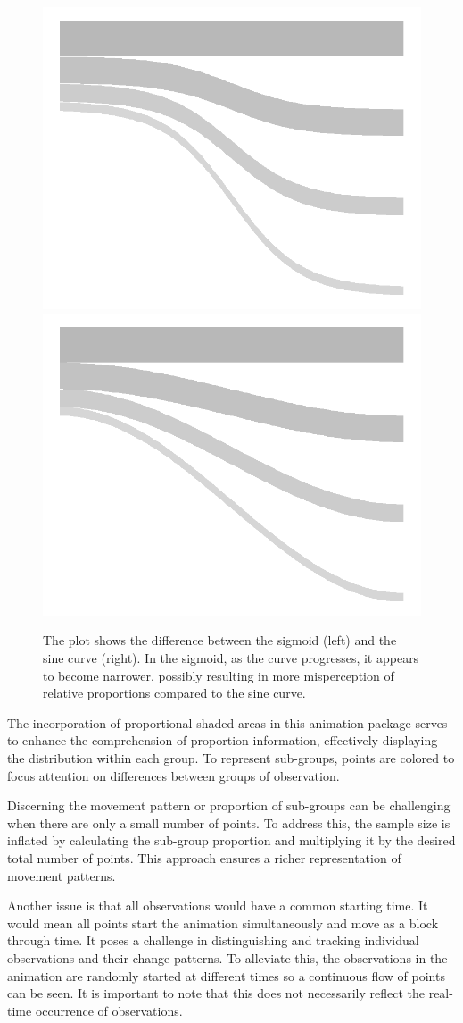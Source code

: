 \begin{figure}
\includegraphics[width=0.5\linewidth]{figures/sigmoid-shade} \includegraphics[width=0.5\linewidth]{figures/sine-shade} \caption{The plot shows the difference between the sigmoid (left) and the sine curve (right). In the sigmoid, as the curve progresses, it appears to become narrower, possibly resulting in more misperception of relative proportions compared to the sine curve.}\label{fig:proportional-shade}
\end{figure}

The incorporation of proportional shaded areas in this animation package serves to enhance the comprehension of proportion information, effectively displaying the distribution within each group. To represent sub-groups, points are colored to focus attention on differences between groups of observation.

Discerning the movement pattern or proportion of sub-groups can be challenging when there are only a small number of points. To address this, the sample size is inflated by calculating the sub-group proportion and multiplying it by the desired total number of points. This approach ensures a richer representation of movement patterns.

Another issue is that all observations would have a common starting time. It would mean all points start the animation simultaneously and move as a block through time. It poses a challenge in distinguishing and tracking individual observations and their change patterns. To alleviate this, the observations in the animation are randomly started at different times so a continuous flow of points can be seen. It is important to note that this does not necessarily reflect the real-time occurrence of observations.

